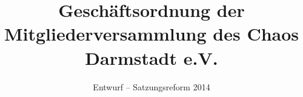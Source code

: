 \documentclass[ngerman]{article}
\begin{document}
\title{Geschäftsordnung der Mitgliederversammlung des Chaos Darmstadt e.V.}

\date{Entwurf -- Satzungsreform 2014}

\maketitle
\end{document}

